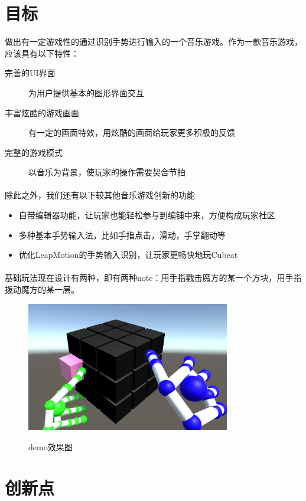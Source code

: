 \documentclass{article} \usepackage{CJK}
\begin{document}
\section{目标}
做出有一定游戏性的通过识别手势进行输入的一个音乐游戏。作为一款音乐游戏，应该具有以下特性：
\begin{description}
  \item[完善的UI界面] 为用户提供基本的图形界面交互
  \item[丰富炫酷的游戏画面] 有一定的画面特效，用炫酷的画面给玩家更多积极的反馈
  \item[完整的游戏模式] 以音乐为背景，使玩家的操作需要契合节拍
\end{description}
\paragraph{}
除此之外，我们还有以下较其他音乐游戏创新的功能
\begin{itemize}
  \item 自带编辑器功能，让玩家也能轻松参与到编铺中来，方便构成玩家社区
  \item 多种基本手势输入法，比如手指点击，滑动，手掌翻动等
  \item 优化LeapMotion的手势输入识别，让玩家更畅快地玩Cubeat
\end{itemize}
\paragraph{}
基础玩法现在设计有两种，即有两种note：用手指戳击魔方的某一个方块，用手指拨动魔方的某一层。
\begin{figure}[H]
  \centering
  \includegraphics[width=24em]{demo.png}\\
  \caption{demo效果图}\label{4-1}
\end{figure}

\section{创新点}
\end{document}
